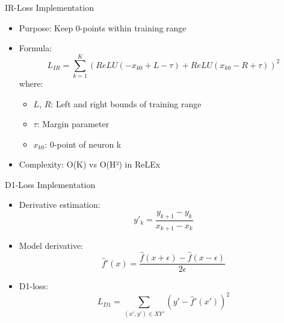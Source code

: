 \documentclass{beamer}
\begin{document}
\begin{frame}{IR-Loss Implementation}
    \begin{itemize}
        \item Purpose: Keep 0-points within training range
        \item Formula:
        \[ L_{IR} = \sum_{k=1}^K (ReLU(-x_{k0} + L - \tau) + ReLU(x_{k0} - R + \tau))^2 \]
        where:
        \begin{itemize}
            \item $L$, $R$: Left and right bounds of training range
            \item $\tau$: Margin parameter
            \item $x_{k0}$: 0-point of neuron k
        \end{itemize}
        \item Complexity: O(K) vs O(H²) in ReLEx
    \end{itemize}
\end{frame}

\begin{frame}{D1-Loss Implementation}
    \begin{itemize}
        \item Derivative estimation:
        \[ y'_k = \frac{y_{k+1} - y_k}{x_{k+1} - x_k} \]
        \item Model derivative:
        \[ \hat{f}'(x) = \frac{\hat{f}(x + \epsilon) - \hat{f}(x - \epsilon)}{2\epsilon} \]
        \item D1-loss:
        \[ L_{D1} = \sum_{(x',y')\in XY'} (y' - \hat{f}'(x'))^2 \]
    \end{itemize}
\end{frame}




\end{document}

